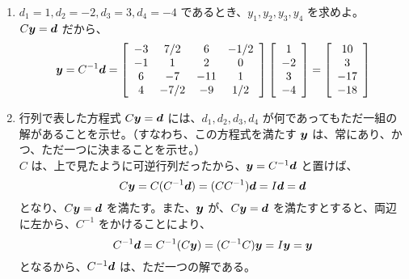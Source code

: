 \begin{enumerate}
\begin{enumerate}
\item $d_1 = 1, d_2 = -2, d_3 = 3, d_4 = -4$ であるとき、$y_1, y_2, y_3, y_4$ を求めよ。\\
\sol 
$C\by = \bd$ だから、
$$\by = C^{-1}\bd = \left [\begin {array}{cccc} -3&7/2&6&-1/2\\-1&1&2
&0\\6&-7&-11&1\\4&-7/2&-9&1/2
\end {array}\right ]\left [\begin {array}{c} 1 \\ -2 \\ 3 \\ -4 \end{array}\right] = 
\left [\begin {array}{c} 10\\3
\\-17\\-18\end {array}\right ]$$

\item 行列で表した方程式 $C\by = \bd$ には、$d_1, d_2, d_3, d_4$ が何であってもただ一組の解があることを示せ。（すなわち、この方程式を満たす $\by$ は、常にあり、かつ、ただ一つに決まることを示せ。）\\
$C$ は、上で見たように可逆行列だったから、$\by = C^{-1}\bd$ と置けば、
$$C\by = C(C^{-1}\bd) = (CC^{-1})\bd = I\bd = \bd$$
となり、$C\by = \bd$ を満たす。また、$\by$ が、$C\by = \bd$ を満たすとすると、両辺に左から、$C^{-1}$ をかけることにより、
$$C^{-1}\bd = C^{-1}(C\by) = (C^{-1}C)\by = I\by = \by$$
となるから、$C^{-1}\bd$ は、ただ一つの解である。
\end{enumerate}


\end{enumerate}

